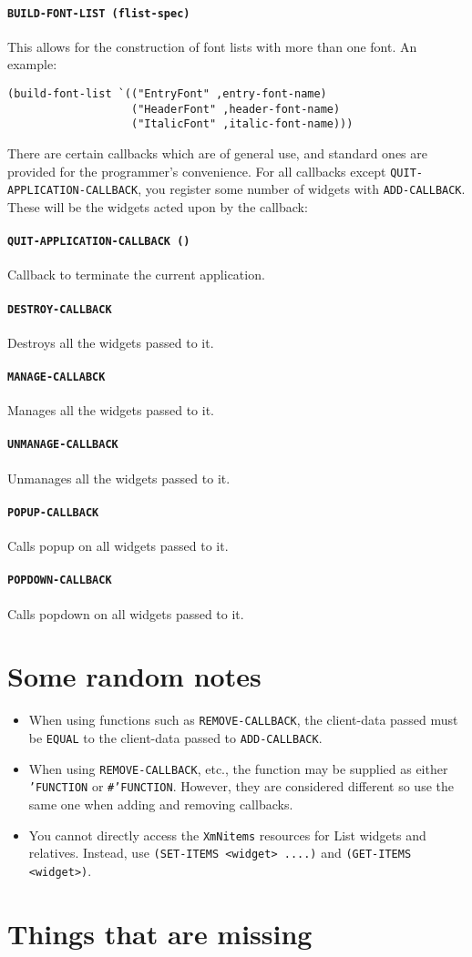 \documentclass[a4paper]{article}
\newcommand{\functdescr}[1]{\paragraph{\texttt{#1}}}
\begin{document}
\functdescr{BUILD-FONT-LIST (flist-spec)} This allows for the
construction of font lists with more than one font.  An example:

\begin{verbatim}
(build-font-list `(("EntryFont" ,entry-font-name)
                   ("HeaderFont" ,header-font-name)
                   ("ItalicFont" ,italic-font-name)))
\end{verbatim}

There are certain callbacks which are of general use, and standard
ones are provided for the programmer's convenience.  For all callbacks
except \texttt{QUIT-APPLICATION-CALLBACK}, you register some number of widgets
with \texttt{ADD-CALLBACK}.  These will be the widgets acted upon by the
callback:

\functdescr{QUIT-APPLICATION-CALLBACK ()} Callback to terminate the
current application.

\functdescr{DESTROY-CALLBACK} Destroys all the widgets passed to it.
\functdescr{MANAGE-CALLABCK } Manages all the widgets passed to it.
\functdescr{UNMANAGE-CALLBACK} Unmanages all the widgets passed to it.
\functdescr{POPUP-CALLBACK } Calls popup on all widgets passed to it.
\functdescr{POPDOWN-CALLBACK} Calls popdown on all widgets passed to it.


\section{Some random notes}

\begin{itemize}

\item When using functions such as \texttt{REMOVE-CALLBACK}, the
	client-data passed must be \texttt{EQUAL} to the client-data
	passed to \texttt{ADD-CALLBACK}.

\item When using \texttt{REMOVE-CALLBACK}, etc., the function may be
	supplied as either \texttt{'FUNCTION} or \texttt{\#'FUNCTION}.
	However, they are considered different so use the same one
	when adding and removing callbacks.

\item You cannot directly access the \texttt{XmNitems} resources for
	List widgets and relatives.  Instead, use \texttt{(SET-ITEMS
	<widget> ....)} and \texttt{(GET-ITEMS <widget>)}.
\end{itemize}


\section{Things that are missing}
\end{document}
